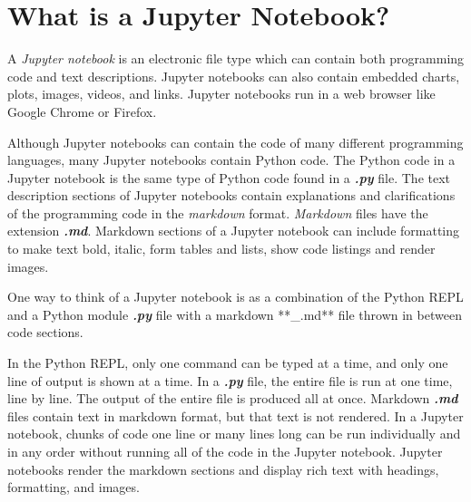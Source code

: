 \documentclass{book}
\begin{document}
    




    
        \section{What is a Jupyter Notebook?}\label{what-is-a-jupyter-notebook}
    




    
        A \emph{Jupyter notebook} is an electronic file type which can contain
both programming code and text descriptions. Jupyter notebooks can also
contain embedded charts, plots, images, videos, and links. Jupyter
notebooks run in a web browser like Google Chrome or Firefox.
    




    
        Although Jupyter notebooks can contain the code of many different
programming languages, many Jupyter notebooks contain Python code. The
Python code in a Jupyter notebook is the same type of Python code found
in a \textbf{\emph{.py}} file. The text description sections of Jupyter
notebooks contain explanations and clarifications of the programming
code in the \emph{markdown} format. \emph{Markdown} files have the
extension \textbf{\emph{.md}}. Markdown sections of a Jupyter notebook
can include formatting to make text bold, italic, form tables and lists,
show code listings and render images.
    




    
        One way to think of a Jupyter notebook is as a combination of the Python
REPL and a Python module \textbf{\emph{.py}} file with a markdown
**\_.md** file thrown in between code sections.

In the Python REPL, only one command can be typed at a time, and only
one line of output is shown at a time. In a \textbf{\emph{.py}} file,
the entire file is run at one time, line by line. The output of the
entire file is produced all at once. Markdown \textbf{\emph{.md}} files
contain text in markdown format, but that text is not rendered. In a
Jupyter notebook, chunks of code one line or many lines long can be run
individually and in any order without running all of the code in the
Jupyter notebook. Jupyter notebooks render the markdown sections and
display rich text with headings, formatting, and images.
    
\end{document}

